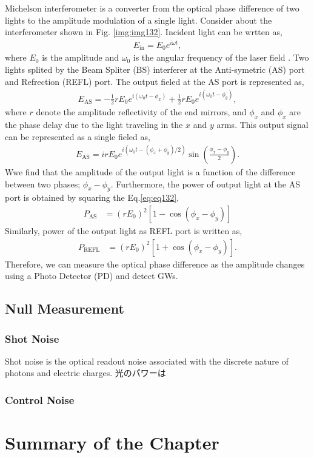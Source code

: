 Michelson interferometer is a converter from the optical phase difference of two lights to the amplitude modulation of a single light. Consider about the interferometer shown in Fig. \ref{img:img132}. Incident light can be wrtten as,
\begin{eqnarray}
  E_{\mathrm{in}} = E_{0} e^{i\omega{t}},
\end{eqnarray}
where $E_0$ is the amplitude and $\omega_0$ is the angular frequency of the laser field
. Two lights splited by the Beam Spliter (BS) interferer at the Anti-symetric (AS) port and Refrection (REFL) port. The output fieled at the AS port is represented as,
\begin{eqnarray}
  E_{\mathrm{AS}} = -\frac{1}{2}rE_{0} e^{i\left(\omega_{0} t-\phi_{x}\right)}+\frac{1}{2}r E_{0} e^{i\left(\omega_{0} t-\phi_{y}\right)},
\end{eqnarray}
where $r$ denote the amplitude reflectivity of the end mirrors, and $\phi_{x}$ and $\phi_{x}$ are the phase delay due to the light traveling in the $x$ and $y$ arms. This output signal can be represented as a single fieled as,
\begin{eqnarray}\label{eq:eq132}
E_{\mathrm{AS}} = i r E_{0} e^{i\left(\omega_{0} t-\left(\phi_{x}+\phi_{y}\right) / 2\right)} \sin \left(\frac{\phi_{x}-\phi_{y}}{2}\right).
\end{eqnarray}
Wwe find that the amplitude of the output light is a function of the difference between two phases; $\phi_{x}-\phi_{y}$. Furthermore, the power of output light at the AS port is obtained by squaring the Eq.\ref{eq:eq132}, 
\begin{eqnarray}
  P_{\mathrm{AS}} &=\left(r E_{0}\right)^{2}\left[1-\cos \left(\phi_{x}-\phi_{y}\right)\right] 
\end{eqnarray}
Similarly, power of the output light as REFL port is written as,
\begin{eqnarray}
  P_{\mathrm{REFL}} &=\left(r E_{0}\right)^{2}\left[1+\cos \left(\phi_{x}-\phi_{y}\right)\right].
\end{eqnarray}
Therefore, we can measure the optical phase difference as the amplitude changes using a Photo Detector (PD) and detect GWs.

\subsection{Null Measurement}

\subsubsection{Shot Noise}
Shot noise is the optical readout noise associated with the discrete nature of photons and electric charges. 光のパワーは

\subsubsection{Control Noise}
\section{Summary of the Chapter}

